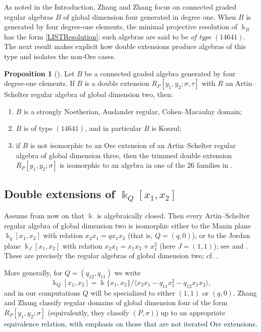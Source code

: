 \documentclass{amsart}
\theoremstyle{definition}
\newtheorem{proposition}[theorem]{Proposition}
\theoremstyle{remark}
\numberwithin{equation}{section}
\begin{document}
As noted in the Introduction, Zhang and Zhang \cite{ZhangZhang2009} focus on connected graded regular algebras $B$ of global dimension four generated in degree one. When $B$ is generated by four degree-one elements, the minimal projective resolution of $\Bbbk_B$ has the form \eqref{LISTResolution}; such algebras are said to be \emph{of type} $(14641)$. The next result makes explicit how double extensions produce algebras of this type and isolates the non-Ore cases.

\begin{proposition}[{\cite[Theorem 0.1]{ZhangZhang2009}}]
Let $B$ be a connected graded algebra generated by four degree-one elements. If $B$ is a double extension $R_P[y_1,y_2;\sigma,\tau]$ with $R$ an Artin--Schelter regular algebra of global dimension two, then:
\begin{enumerate}
    \item[\rm (1)] $B$ is a strongly Noetherian, Auslander regular, Cohen--Macaulay domain;
    \item[\rm (2)] $B$ is of type $(14641)$, and in particular $B$ is Koszul;
    \item[\rm (3)] if $B$ is not isomorphic to an Ore extension of an Artin--Schelter regular algebra of global dimension three, then the trimmed double extension $R_P[y_1,y_2;\sigma]$ is isomorphic to an algebra in one of the $26$ families in \cite{ZhangZhang2009}.
\end{enumerate}
\end{proposition}

\subsection{Double extensions of \texorpdfstring{$\Bbbk_Q[x_1,x_2]$}{Lg}}

Assume from now on that $\Bbbk$ is algebraically closed. Then every Artin--Schelter regular algebra of global dimension two is isomorphic either to the Manin plane $\Bbbk_q[x_1,x_2]$ with relation $x_2x_1=qx_1x_2$ (that is, $Q=(q,0)$), or to the Jordan plane $\Bbbk_J[x_1,x_2]$ with relation $x_2x_1=x_1x_2+x_1^2$ (here $J=(1,1)$); see \cite[Theorem 1.4]{Shirikov2005} and \cite[Lemma 2.4]{ZhangZhang2009}. These are precisely the regular algebras of global dimension two; cf. \cite[Examples 1.8 and 1.9]{Rogalski2023}.

More generally, for $Q=(q_{12},q_{11})$ we write
\[
\Bbbk_Q[x_1,x_2]=\Bbbk\{x_1,x_2\}/\langle x_2x_1-q_{11}x_1^2-q_{12}x_1x_2\rangle,
\]
and in our computations $Q$ will be specialized to either $(1,1)$ or $(q,0)$. Zhang and Zhang \cite[Section 3]{ZhangZhang2009} classify regular domains of global dimension four of the form $R_P[y_1,y_2;\sigma]$ (equivalently, they classify $(P,\sigma)$) up to an appropriate equivalence relation, with emphasis on those that are not iterated Ore extensions.
\end{document}

